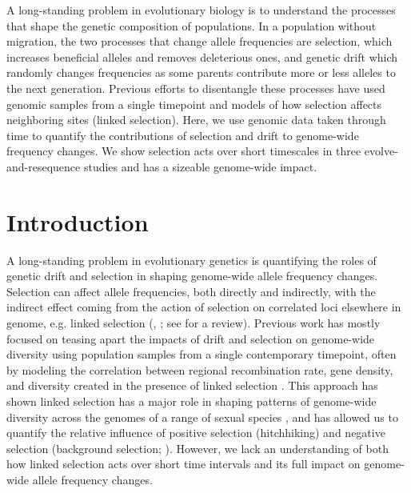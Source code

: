 \documentclass[11pt]{article}
\begin{document}
A long-standing problem in evolutionary biology is to understand the processes
that shape the genetic composition of populations. In a population without
migration, the two processes that change allele frequencies are selection,
which increases beneficial alleles and removes deleterious ones, and genetic
drift which randomly changes frequencies as some parents contribute more or
less alleles to the next generation. Previous efforts to disentangle these
processes have used genomic samples from a single timepoint and models of how
selection affects neighboring sites (linked selection). Here, we use genomic
data taken through time to quantify the contributions of selection and drift to
genome-wide frequency changes. We show selection acts over short timescales in
three evolve-and-resequence studies and has a sizeable genome-wide impact.



\section{Introduction}

A long-standing problem in evolutionary genetics is quantifying the roles of
genetic drift and selection in shaping genome-wide allele frequency changes.
Selection can affect allele frequencies, both directly and indirectly, with the
indirect effect coming from the action of selection on correlated loci
elsewhere in genome, e.g. linked selection (\cite{Maynard_Smith1974-zr},
\cite{Charlesworth1993-gb,Nordborg1996-nq}; see \cite{Barton2000-zg} for a
review). Previous work has mostly focused on teasing apart the impacts of drift
and selection on genome-wide diversity using population samples from a single
contemporary timepoint, often by modeling the correlation between regional
recombination rate, gene density, and diversity created in the presence of
linked selection \parencite{Cutter2013-ba,Sella2009-nx}. This approach has
shown linked selection has a major role in shaping patterns of genome-wide
diversity across the genomes of a range of sexual species
\parencite{Macpherson2007-qt,Andolfatto2007-uy,Begun2007-bg,Beissinger2016-cm,Sattath2011-dr,Williamson2014-oy,Andersen2012-bj,Cutter2010-gi,Elyashiv2016-vt},
and has allowed us to quantify the relative influence of positive selection
(hitchhiking) and negative selection (background selection;
\cite{Nordborg2005-dc,McVicker2009-ax,Andolfatto2007-uy,Macpherson2007-qt,Hernandez2011-gs,Elyashiv2016-vt}).
However, we lack an understanding of both how linked selection acts over short
time intervals and its full impact on genome-wide allele frequency changes.
\end{document}
